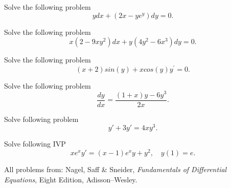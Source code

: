 \documentclass[11pt]{article}
\begin{document}
\begin{problem}
Solve the following problem
\begin{equation*}
ydx + (2x - y e^{y}) dy = 0.
\end{equation*}
\end{problem}


\begin{problem}
Solve the following problem
\begin{equation*}
x \left( 2 - 9xy^2 \right)dx + y(4y^2 - 6x^3) dy = 0.
\end{equation*}
\end{problem}


\begin{problem}
Solve the following problem
\begin{equation*}
\left( x + 2 \right) sin(y) + x cos(y) y^{\prime} = 0.
\end{equation*}
\end{problem}



\begin{problem}
Solve the following problem
\begin{equation*}
     \frac{dy}{dx}=\frac{(1+x)y-6y^{3}}{2x}.
\end{equation*}
\end{problem}




\begin{problem}
Solve following problem
\begin{equation*}
      y'+3y'=4xy^{3}.
\end{equation*}
\end{problem}


\begin{problem}
Solve following IVP
\begin{equation*}
      xe^{x}y' = (x-1)e^{x}y+y^{2}, \quad y(1)=e.
\end{equation*}
\end{problem}







\LabSolutions

All problems from: Nagel, Saff \& Sneider, \textit{Fundamentals of Differential Equations}, Eight Edition, Adisson--Wesley.
\end{document}
